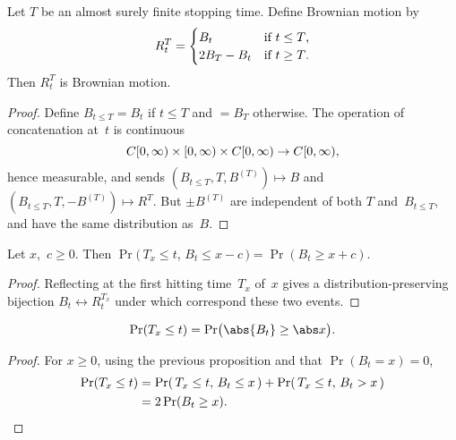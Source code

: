 \begin	{theorem}
Let $T$ be an almost surely finite stopping time.
Define  Brownian motion by \[
	R^T_t =
	\begin	{cases}
		B_t	& \text{if \( t \le T \),} \\
		2B_T - B_t	& \text{if \( t \ge T \).}
	\end	{cases}
\]
Then $R^T_t$ is Brownian motion.
\end	{theorem}
\begin	{proof}
Define \(B_{t \le T} = B_t\) if \( t \le T \) and \( = B_T \) otherwise.
The operation of concatenation at~$t$ is continuous \[
	C[0,\infty) \times [0,\infty) \times C[0,\infty) \to C[0,\infty)
	\text,
\] hence measurable,
and sends \( (B_{t \le T},T,B^{(T)}) \mapsto B \)
and \( (B_{t \le T},T,-B^{(T)}) \mapsto R^T \).
But $\pm B^{(T)}$ are independent of both $T$ and~$B_{t \le T}$,
and have the same distribution as~$B$.
\end	{proof}

\begin	{proposition}
Let $x$,~\( c \ge 0 \).
Then \( \Pr(\, T_x \le t \), \( B_t \le x - c \,)
	= \Pr( B_t \ge x+c ) \).
\end	{proposition}
\begin	{proof}
Reflecting at the first hitting time~$T_x$ of~$x$
gives a distribution-preserving bijection \( B_t \leftrightarrow R^{T_x}_t \)
under which correspond these two events.
\end	{proof}

\begin	{theorem}
\begin	{equation*}
	\Pr(T_x \le t) = \Pr\bigl( \abs{B_t} \ge \abs x \bigr) \text.
\end	{equation*}
\end	{theorem}
\begin	{proof}
For \( x \ge 0 \),
using the previous proposition and that \( \Pr(B_t=x) = 0 \),
\begin	{align*}
	\Pr( T_x \le t)
	&=	\Pr(\, \text{\( T_x \le t \), \( B_t \le x \)} \,)
	+	\Pr(\, \text{\( T_x \le t \), \( B_t >   x \)} \,) \\
	&=	2\Pr( B_t \ge x ) \text.
	\qedhere
\end	{align*}
\end	{proof}

